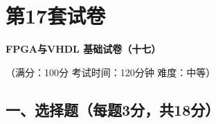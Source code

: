 \chapter{第17套试卷}

\begin{center}
\textbf{FPGA与VHDL 基础试卷（十七）}

（满分：100分 \hspace{2em} 考试时间：120分钟 \hspace{2em} 难度：中等）
\end{center}

\section*{一、选择题（每题3分，共18分）}

